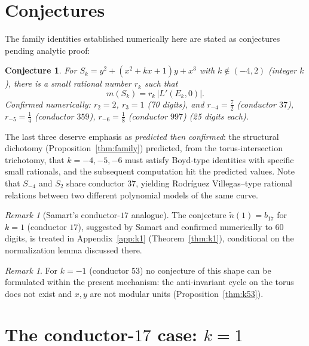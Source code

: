 \documentclass[11pt]{amsart}
\newtheorem{conjecture}[theorem]{Conjecture}
\theoremstyle{definition}
\theoremstyle{remark}
\newtheorem{remark}[theorem]{Remark}
\begin{document}
\section{Conjectures}
\label{sec:conjectures}

The family identities established numerically here are stated as conjectures
pending analytic proof:

\begin{conjecture}\label{conj:family}
For $S_k=y^2+(x^2+kx+1)y+x^3$ with $k\notin(-4,2)$ (integer $k$), there is a
small rational number $r_k$ such that
\[
  m(S_k)=r_k\,|L'(E_k,0)|.
\]
Confirmed numerically: $r_2=2$, $r_3=1$ (70 digits), and
$r_{-4}=\tfrac72$ (conductor $37$), $r_{-5}=\tfrac14$ (conductor $359$),
$r_{-6}=\tfrac18$ (conductor $997$) (25 digits each).
\end{conjecture}

The last three deserve emphasis as \emph{predicted then confirmed}: the
structural dichotomy (Proposition~\ref{thm:family}) predicted, from the
torus-intersection trichotomy, that $k=-4,-5,-6$ must satisfy Boyd-type
identities with specific small rationals, and the subsequent computation hit
the predicted values. Note that $S_{-4}$ and $S_2$ share conductor $37$,
yielding Rodr\'iguez Villegas--type rational relations \cite{RV,LalinRam}
between two different polynomial models of the same curve.

\begin{remark}[Samart's conductor-$17$ analogue]
The conjecture $\tilde n(1)=b_{17}$ for $k=1$ (conductor $17$), suggested by
Samart and confirmed numerically to $60$ digits, is treated in
Appendix~\ref{app:k1} (Theorem~\ref{thm:k1}), conditional on the
normalization lemma discussed there.
\end{remark}

\begin{remark}
For $k=-1$ (conductor $53$) no conjecture of this shape can be formulated
within the present mechanism: the anti-invariant cycle on the torus does not
exist and $x,y$ are not modular units (Proposition~\ref{thm:k53}).
\end{remark}

\appendix
\section{The conductor-\texorpdfstring{$17$}{17} case: \texorpdfstring{$k=1$}{k=1}}
\label{sec:k1}
\label{app:k1}
\end{document}

